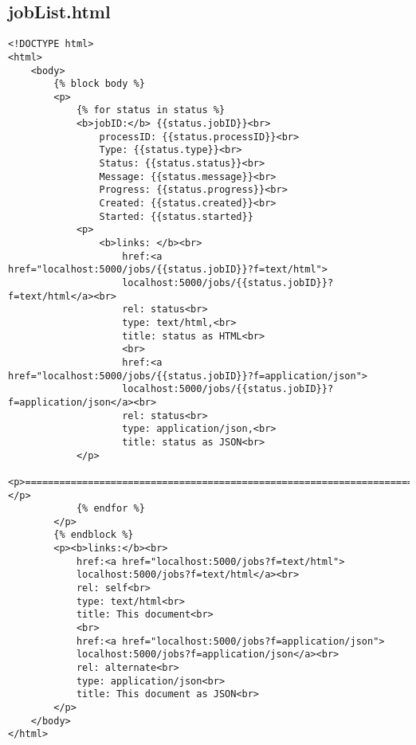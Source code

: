 \subsection{jobList.html}
\begin{lstlisting}[caption={jobList.html}, style = HTML]
<!DOCTYPE html>
<html>
    <body>
        {% block body %}
        <p>
            {% for status in status %}
            <b>jobID:</b> {{status.jobID}}<br>
                processID: {{status.processID}}<br>
                Type: {{status.type}}<br>
                Status: {{status.status}}<br>
                Message: {{status.message}}<br>
                Progress: {{status.progress}}<br>
                Created: {{status.created}}<br>
                Started: {{status.started}}
            <p>
                <b>links: </b><br>
                    href:<a href="localhost:5000/jobs/{{status.jobID}}?f=text/html">
                    localhost:5000/jobs/{{status.jobID}}?f=text/html</a><br>
                    rel: status<br>
                    type: text/html,<br>
                    title: status as HTML<br>
                    <br>
                    href:<a href="localhost:5000/jobs/{{status.jobID}}?f=application/json">
                    localhost:5000/jobs/{{status.jobID}}?f=application/json</a><br>
                    rel: status<br>
                    type: application/json,<br>
                    title: status as JSON<br>
            </p>
            <p>=====================================================================</p>
            {% endfor %}
        </p>
        {% endblock %}
        <p><b>links:</b><br>
            href:<a href="localhost:5000/jobs?f=text/html">
            localhost:5000/jobs?f=text/html</a><br>
            rel: self<br>
            type: text/html<br>
            title: This document<br>
            <br>
            href:<a href="localhost:5000/jobs?f=application/json">
            localhost:5000/jobs?f=application/json</a><br>
            rel: alternate<br>
            type: application/json<br>
            title: This document as JSON<br>
        </p>
    </body>
</html>
\end{lstlisting}\label{RessourceJobListHTML}  

